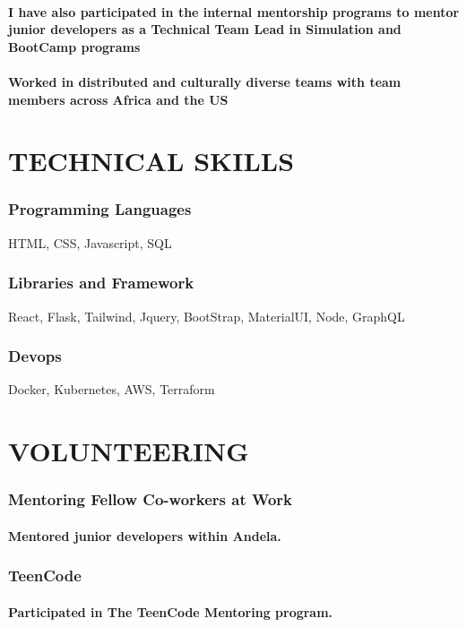 \documentclass{article}
\begin{document}
\paragraph{I have also participated in the internal mentorship programs to mentor junior developers as a Technical Team Lead in Simulation and BootCamp programs}
\paragraph{Worked in distributed and culturally diverse teams with team members across Africa and the US}
\section{TECHNICAL SKILLS}
\subsubsection{Programming Languages}
HTML, CSS, Javascript, SQL
\subsubsection{Libraries and Framework}
React, Flask, Tailwind, Jquery, BootStrap, MaterialUI, Node, GraphQL
\subsubsection{Devops}
Docker, Kubernetes, AWS, Terraform
\section{VOLUNTEERING}
\subsubsection{Mentoring Fellow Co-workers at Work}
\paragraph{Mentored junior developers within Andela.}
\subsubsection{TeenCode}
\paragraph{Participated in The TeenCode Mentoring program.}
\end{document}
